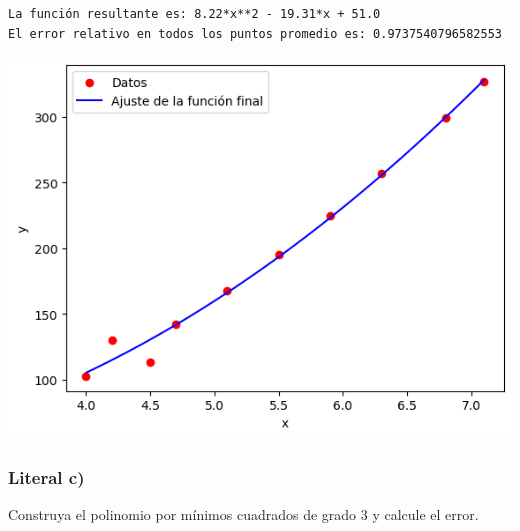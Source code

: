 \documentclass[
  letterpaper,
  DIV=11,
  numbers=noendperiod]{scrartcl}
\begin{document}
\begin{verbatim}
La función resultante es: 8.22*x**2 - 19.31*x + 51.0
El error relativo en todos los puntos promedio es: 0.9737540796582553
\end{verbatim}

\includegraphics{Tarea8_MN_files/figure-pdf/cell-5-output-2.png}

\subsubsection{Literal c)}\label{literal-c}

Construya el polinomio por mínimos cuadrados de grado 3 y calcule el
error.
\end{document}
